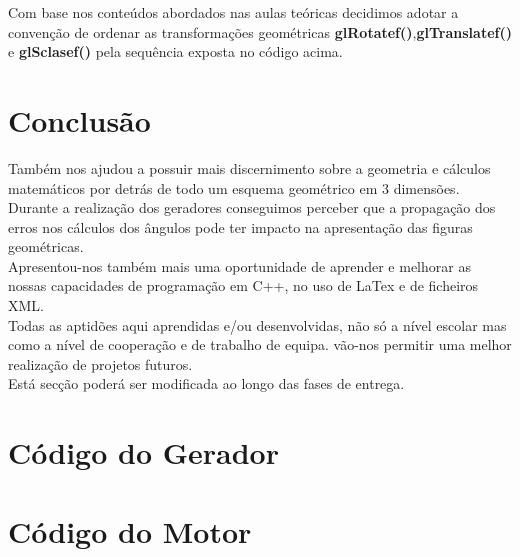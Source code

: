 \documentclass{article}
\begin{document}
\begin{info}
Com base nos conteúdos abordados nas aulas teóricas decidimos adotar a convenção de ordenar as transformações geométricas \textbf{glRotatef()},\textbf{glTranslatef()} e \textbf{glSclasef()}  pela sequência exposta no código acima.
\end{info}

\newpage

\section{Conclusão}
Também nos ajudou a possuir mais discernimento sobre a geometria e cálculos matemáticos por detrás de todo um esquema geométrico em 3 dimensões.\\
Durante a realização dos geradores conseguimos perceber que a propagação dos erros nos cálculos dos ângulos pode ter impacto na apresentação das figuras geométricas.\\
Apresentou-nos também mais uma oportunidade de aprender e melhorar as nossas capacidades de programação em C++, no uso de LaTex e de ficheiros XML.\\
Todas as aptidões aqui aprendidas e/ou desenvolvidas, não só a nível escolar mas como a nível de cooperação e  de trabalho de equipa. vão-nos permitir uma melhor realização de projetos futuros.\\
Está secção poderá ser modificada ao longo das fases de entrega.\\

\newpage


\appendix

\section{Código do Gerador}

\newpage

\section{Código do Motor}
\end{document}

